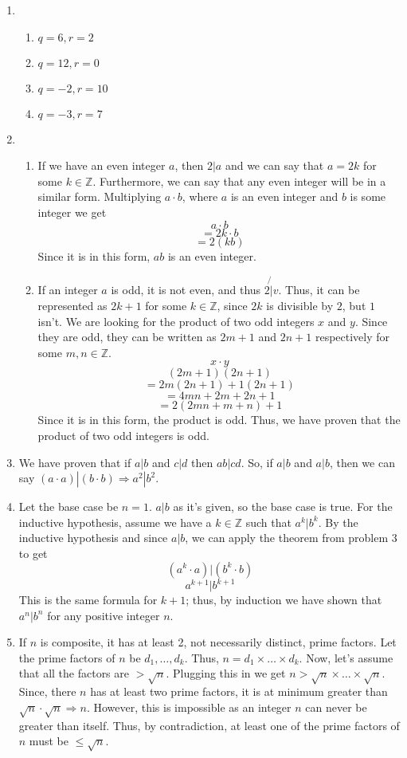 \documentclass{article}
\begin{document}
\begin{enumerate}[label=\textbf{\arabic*}.]
    \Large
    \item
    \begin{enumerate}[label=\textbf{\alph*}.]
        \item $q=6,r=2$
        \item $q=12,r=0$
        \item $q=-2,r=10$
        \item $q=-3,r=7$
    \end{enumerate}
    \item 
    \begin{enumerate}[label=\textbf{\alph*}.]
        \item If we have an even integer $a$, then $2|a$ and we can say that $a=2k$ for some $k\in\mathbb{Z}$. Furthermore, we can say that any even integer will be in a similar form. Multiplying $a\cdot b$, where $a$ is an even integer and $b$ is some integer we get
        \[a\cdot b\]
        \[=2k\cdot b\]
        \[=2(kb)\]
        Since it is in this form, $ab$ is an even integer.
        \item If an integer $a$ is odd, it is not even, and thus $2\not{|}v$. Thus, it can be represented as $2k+1$ for some $k\in\mathbb{Z}$, since $2k$ is divisible by $2$, but $1$ isn't. We are looking for the product of two odd integers $x$ and $y$. Since they are odd, they can be written as $2m+1$ and $2n+1$ respectively for some $m,n\in\mathbb{Z}$.
        \[x\cdot y\]
        \[(2m+1)(2n+1)\]
        \[=2m(2n+1)+1(2n+1)\]
        \[=4mn+2m+2n+1\]
        \[=2(2mn+m+n)+1\]
        Since it is in this form, the product is odd. Thus, we have proven that the product of two odd integers is odd.
    \end{enumerate}
    \item We have proven that if $a|b$ and $c|d$ then $ab|cd$. So, if $a|b$ and $a|b$, then we can say $(a\cdot a)|(b \cdot b) \Rightarrow a^2|b^2$.
    \item Let the base case be $n=1$. $a|b$ as it's given, so the base case is true.
    For the inductive hypothesis, assume we have a $k\in\mathbb{Z}$ such that $a^k|b^k$. By the inductive hypothesis and since $a|b$, we can apply the theorem from problem 3 to get 
    \[(a^k\cdot a)|(b^k\cdot b)\]
    \[a^{k+1}|b^{k+1}\]
    This is the same formula for $k+1$; thus, by induction we have shown that $a^n|b^n$ for any positive integer $n$.
    \item If $n$ is composite, it has at least 2, not necessarily distinct, prime factors. Let the prime factors of $n$ be $d_1,\dots,d_k$. Thus, $n=d_1\times\dots\times d_k$. Now, let's assume that all the factors are $>\sqrt{n}$. Plugging this in we get $n>\sqrt{n}\times\dots\times\sqrt{n}$. Since, there $n$ has at least two prime factors, it is at minimum greater than $\sqrt{n}\cdot\sqrt{n}\Rightarrow n$. However, this is impossible as an integer $n$ can never be greater than itself. Thus, by contradiction, at least one of the prime factors of $n$ must be $\leq\sqrt{n}$.

\end{enumerate}
\end{document}
